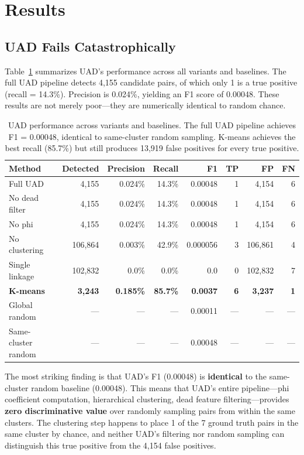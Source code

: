 \documentclass{article}
\begin{document}
\section{Results}
\label{sec:results}

\subsection{UAD Fails Catastrophically}

Table~\ref{tab:uad_performance} summarizes UAD's performance across all variants and baselines. The full UAD pipeline detects 4,155 candidate pairs, of which only 1 is a true positive (recall = 14.3\%). Precision is 0.024\%, yielding an F1 score of 0.00048. These results are not merely poor---they are numerically identical to random chance.

\begin{table}[t]
\caption{UAD performance across variants and baselines. The full UAD pipeline achieves F1 = 0.00048, identical to same-cluster random sampling. K-means achieves the best recall (85.7\%) but still produces 13,919 false positives for every true positive.}
\label{tab:uad_performance}
\centering
\small
\begin{tabular}{lrrrrrrr}
\toprule
Method & Detected & Precision & Recall & F1 & TP & FP & FN \\
\midrule
Full UAD & 4,155 & 0.024\% & 14.3\% & 0.00048 & 1 & 4,154 & 6 \\
No dead filter & 4,155 & 0.024\% & 14.3\% & 0.00048 & 1 & 4,154 & 6 \\
No phi & 4,155 & 0.024\% & 14.3\% & 0.00048 & 1 & 4,154 & 6 \\
No clustering & 106,864 & 0.003\% & 42.9\% & 0.000056 & 3 & 106,861 & 4 \\
Single linkage & 102,832 & 0.0\% & 0.0\% & 0.0 & 0 & 102,832 & 7 \\
\textbf{K-means} & \textbf{3,243} & \textbf{0.185\%} & \textbf{85.7\%} & \textbf{0.0037} & \textbf{6} & \textbf{3,237} & \textbf{1} \\
Global random & --- & --- & --- & 0.00011 & --- & --- & --- \\
Same-cluster random & --- & --- & --- & 0.00048 & --- & --- & --- \\
\bottomrule
\end{tabular}
\end{table}

The most striking finding is that UAD's F1 (0.00048) is \textbf{identical} to the same-cluster random baseline (0.00048). This means that UAD's entire pipeline---phi coefficient computation, hierarchical clustering, dead feature filtering---provides \textbf{zero discriminative value} over randomly sampling pairs from within the same clusters. The clustering step happens to place 1 of the 7 ground truth pairs in the same cluster by chance, and neither UAD's filtering nor random sampling can distinguish this true positive from the 4,154 false positives.
\end{document}
